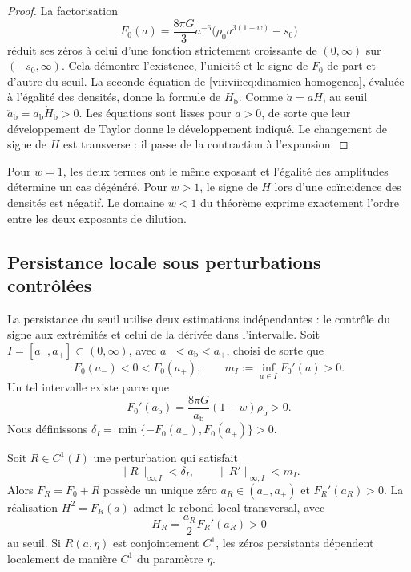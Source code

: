\begin{proof}
La factorisation
\[
 F_0(a)=\frac{8\pi G}{3}a^{-6}
             \bigl(\rho_0a^{3(1-w)}-s_0\bigr)
\]
réduit ses zéros à celui d'une fonction strictement croissante de
\((0,\infty)\) sur \((-s_0,\infty)\). Cela démontre l'existence,
l'unicité et le signe de \(F_0\) de part et d'autre du seuil.
La seconde équation de \eqref{vii:vii:eq:dinamica-homogenea}, évaluée
à l'égalité des densités, donne la formule de \(\dot H_{\mathrm b}\).
Comme \(\dot a=aH\), au seuil
\(\ddot a_{\mathrm b}=a_{\mathrm b}\dot H_{\mathrm b}>0\).
Les équations sont lisses pour \(a>0\), de sorte que leur développement de
Taylor donne le développement indiqué. Le changement de signe de \(H\) est
transverse : il passe de la contraction à l'expansion.
\end{proof}

Pour \(w=1\), les deux termes ont le même exposant et l'égalité des
amplitudes détermine un cas dégénéré. Pour \(w>1\), le signe de
\(\dot H\) lors d'une coïncidence des densités est négatif.
Le domaine \(w<1\) du théorème exprime exactement l'ordre entre les
deux exposants de dilution.

\subsection{Persistance locale sous perturbations contrôlées}
\label{vii:vii:sec:persistencia}

La persistance du seuil utilise deux estimations indépendantes : le contrôle du signe aux extrémités et celui de la dérivée dans l'intervalle. Soit \(I=[a_-,a_+]\subset(0,\infty)\), avec \(a_-<a_{\mathrm b}<a_+\), choisi de sorte que
\[
 F_0(a_-)<0<F_0(a_+),\qquad
 m_I:=\inf_{a\in I}F_0'(a)>0.
\]
Un tel intervalle existe parce que
\[
 F_0'(a_{\mathrm b})
   =\frac{8\pi G}{a_{\mathrm b}}(1-w)\rho_{\mathrm b}>0.
\]
Nous définissons
\(\delta_I=\min\{-F_0(a_-),F_0(a_+)\}>0\).

\begin{theorem}
\label{vii:vii:thm:persistencia}
Soit \(R\in C^1(I)\) une perturbation qui satisfait
\[
 \|R\|_{\infty,I}<\delta_I,\qquad
 \|R'\|_{\infty,I}<m_I.
\]
Alors \(F_R=F_0+R\) possède un unique zéro \(a_R\in(a_-,a_+)\) et \(F_R'(a_R)>0\). La réalisation \(H^2=F_R(a)\) admet le rebond local transversal, avec
\[
 \dot H_R=\frac{a_R}{2}F_R'(a_R)>0
\]
au seuil. Si \(R(a,\eta)\) est conjointement \(C^1\), les zéros
persistants dépendent localement de manière \(C^1\) du paramètre \(\eta\).
\end{theorem}

